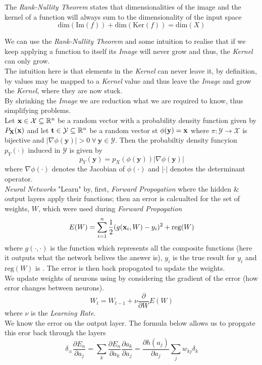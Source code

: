 \documentclass[11pt,a4paper]{article}
\begin{document}
The \textit{Rank-Nullity Theorem} states that dimensionalities of the image and the kernel of a function will always sum to the dimensionality of the input space
$$\text{dim}(\text{Im}(f))+\text{dim}(\text{Ker}(f))=\text{dim}(X)$$

We can use the \textit{Rank-Nullity Theorem} and some intuition to realise that if we keep applying a function to itself its \textit{Image} will never grow and thus, the \textit{Kernel} can only grow.\\
The intuition here is that elements in the \textit{Kernel} can never leave it, by definition, by values may be mapped to a \textit{Kernel} value and thus leave the \textit{Image} and grow the \textit{Kernel}, where they are now stuck.\\

By shrinking the \textit{Image} we are reduction what we are required to know, thus simplifying problems.\\

Let $\textbf{x}\in\mathcal{X}\subseteq\mathbb{R}^n$ be a random vector with a probability density function given by $P_{\textbf{X}}(\textbf{x})$ and let $\textbf{t}\in\mathcal{Y}\subseteq\mathbb{R}^n$ be a random vector st $\phi(\textbf{y})=\textbf{x}$ where $\pi:\mathcal{Y}\to\mathcal{X}$ is bijective and $|\nabla\phi(\textbf{y})|>0\ \forall\ \textbf{y}\in\mathcal{Y}$. Then the probabiltiy density funcyion $p_Y(\cdot)$ induced in $\mathcal{Y}$ is given by
$$p_Y(\textbf{y})=p_X(\phi(\textbf{y}))|\nabla\phi(\textbf{y})|$$
where $\nabla\phi(\cdot)$ denotes the Jacobian of $\phi(\cdot)$ and $|\cdot|$ denotes the determinant operator.\\

\textit{Neural Networks} "Learn" by, first, \textit{Forward Propogation} where the hidden \& output layers apply their functions; then an error is calcualted for the set of weights, $W$, which were used during \textit{Forward Propogation}
$$E(W)=\sum_{i=1}^n\frac{1}{2}(g(\textbf{x}_i,W)-y_i)^2+\text{reg}(W)$$
where $g(\cdot,\cdot)$ is the function which represents all the composite functions (here it outputs what the network belives the answer is), $y_i$ is the true result for $y_i$ and $\text{reg}(W)$ is %
. The error is then back propogated to update the weights.\\

We update weights of neurons using by considering the gradient of the error (\ie how error changes between neurons).
$$W_t=W_{t-1}+\nu\frac{\partial}{\partial W}E(W)$$
where $\nu$ is the \textit{Learning Rate}.\\
We know the error on the output layer. The formula below allows us to propgate this eror back through the layers
$$\delta_\equiv\frac{\partial E_n}{\partial a_j}=\sum_k\frac{\partial E_n}{\partial a_k}\frac{\partial a_k}{\partial a_j}=\frac{\partial h(a_j)}{\partial a_j}\sum_jw_{kj}\delta_k$$
\end{document}
